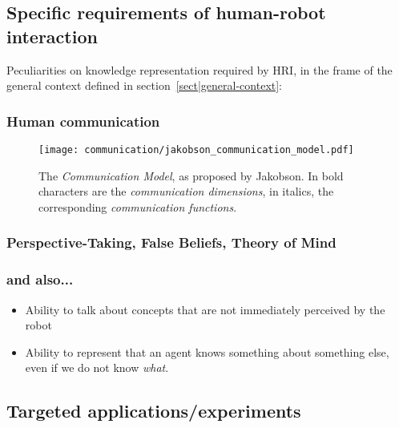 
\subsection{Specific requirements of human-robot interaction}
\label{sect|pecularities-krs-for-hri}

Peculiarities on knowledge representation required by HRI, in the frame of the
general context defined in section~\ref{sect|general-context}:

\subsubsection{Human communication}

\begin{figure}%
\centering
  \texttt{[image: communication/jakobson\_communication\_model.pdf]}
  \caption{The \emph{Communication Model}, as proposed by Jakobson. In bold
  characters are the \emph{communication dimensions}, in italics, the
  corresponding \emph{communication functions}.}
  \label{fig|jakobson_communication_model}
\end{figure}

\subsubsection{Perspective-Taking, False Beliefs, Theory of Mind}


\subsubsection{and also...}

\begin{itemize}
	\item Ability to talk about concepts that are not immediately perceived by
	the robot


	\item {} Ability to
	represent that an agent knows something about something else, even if we do
	not know \emph{what}.

\end{itemize}

\subsection{Targeted applications/experiments}
\label{sect|targeted-applications-experiments}


